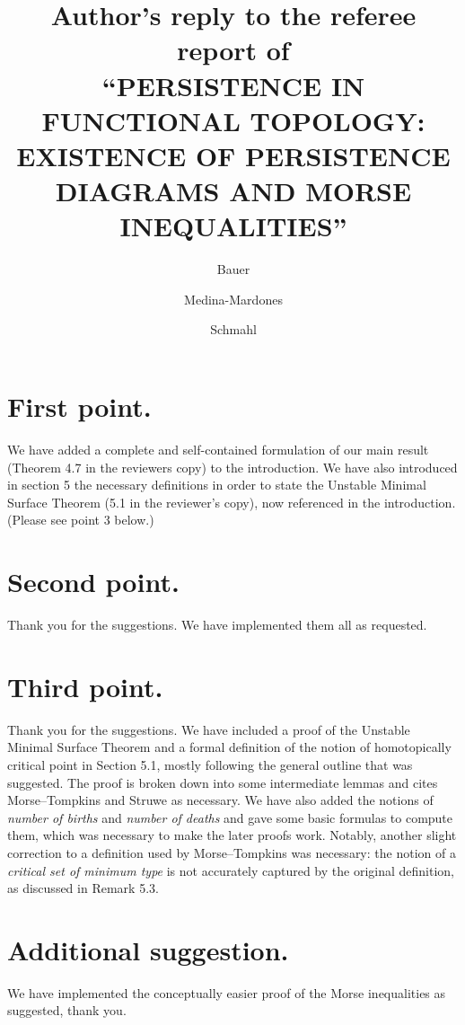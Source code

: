 \documentclass{article}
\title{Author's reply to the referee report of \\ \textsc{
    ``PERSISTENCE IN FUNCTIONAL TOPOLOGY: EXISTENCE OF PERSISTENCE DIAGRAMS AND MORSE INEQUALITIES''
    }
}
\author{Bauer \and Medina-Mardones \and Schmahl}
\begin{document}
	\maketitle
	\section{First point.} We have added a complete and self-contained formulation of our main result (Theorem 4.7 in the reviewers copy) to the introduction.
    We have also introduced in section 5 the necessary definitions in order to state the Unstable Minimal Surface Theorem (5.1 in the reviewer's copy), now referenced in the introduction.
    (Please see point 3 below.)

	\section{Second point.} Thank you for the suggestions.
	We have implemented them all as requested.

	\section{Third point.} Thank you for the suggestions. 
	We have included a proof of the Unstable Minimal Surface Theorem and a formal definition of the notion of homotopically critical point in Section 5.1, mostly following the general outline that was suggested. 
	The proof is broken down into some intermediate lemmas and cites Morse--Tompkins and Struwe as necessary.
	We have also added the notions of \emph{number of births} and \emph{number of deaths} and gave some basic formulas to compute them, which was necessary to make the later proofs work.
	Notably, another slight correction to a definition used by Morse--Tompkins was necessary: the notion of a \emph{critical set of minimum type} is not accurately captured by the original definition, as discussed in Remark 5.3.

	\section{Additional suggestion.} We have implemented the conceptually easier proof of the Morse inequalities as suggested, thank you.
\end{document}
